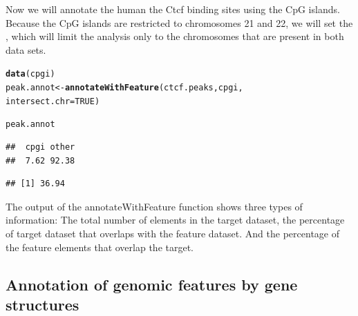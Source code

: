 \documentclass{article}\usepackage[]{graphicx}\usepackage[]{color}
\makeatletter
\newcommand{\hlnum}[1]{\textcolor[rgb]{0.686,0.059,0.569}{#1}}%
\newcommand{\hlstd}[1]{\textcolor[rgb]{0.345,0.345,0.345}{#1}}%
\newcommand{\hlkwb}[1]{\textcolor[rgb]{0.69,0.353,0.396}{#1}}%
\newcommand{\hlkwc}[1]{\textcolor[rgb]{0.333,0.667,0.333}{#1}}%
\newcommand{\hlkwd}[1]{\textcolor[rgb]{0.737,0.353,0.396}{\textbf{#1}}}%
\newenvironment{kframe}{%
 \def\at@end@of@kframe{}%
 \ifinner\ifhmode%
  \def\at@end@of@kframe{\end{minipage}}%
  \begin{minipage}{\columnwidth}%
 \fi\fi%
 \def\FrameCommand##1{\hskip\@totalleftmargin \hskip-\fboxsep
 \colorbox{shadecolor}{##1}\hskip-\fboxsep
     \hskip-\linewidth \hskip-\@totalleftmargin \hskip\columnwidth}%
 \MakeFramed {\advance\hsize-\width
   \@totalleftmargin\z@ \linewidth\hsize
   \@setminipage}}%
 {\par\unskip\endMakeFramed%
 \at@end@of@kframe}
\newenvironment{knitrout}{}{} %
\makeatother
\begin{document}
Now we will annotate the human the Ctcf binding sites using the CpG islands.
Because the CpG islands are restricted to chromosomes 21 and 22, we will set the
, which will limit the analysis only to the 
chromosomes that are present in both data sets.
\begin{knitrout}
\color{fgcolor}\begin{kframe}
\begin{alltt}
\hlkwd{data}\hlstd{(cpgi)}
\hlstd{peak.annot} \hlkwb{<-} \hlkwd{annotateWithFeature}\hlstd{(ctcf.peaks, cpgi,}
    \hlkwc{intersect.chr} \hlstd{=} \hlnum{TRUE}\hlstd{)}
\end{alltt}


{\ttfamily\noindent\itshape\color{messagecolor}{\#\# intersecting chromosomes...}}\begin{alltt}
\hlstd{peak.annot}
\end{alltt}


{\ttfamily\noindent\itshape\color{messagecolor}{\#\# summary of target set annotation with feature annotation:\\\#\# Rows in target set: 3964\\\#\# ----------------------------\\\#\# percentage of target elements overlapping with features:}}\begin{verbatim}
##  cpgi other 
##  7.62 92.38
\end{verbatim}


{\ttfamily\noindent\itshape\color{messagecolor}{\#\# \\\#\# percentage of feature elements overlapping with target:}}\begin{verbatim}
## [1] 36.94
\end{verbatim}


{\ttfamily\noindent\itshape\color{messagecolor}{\#\# }}\end{kframe}
\end{knitrout}


The output of the annotateWithFeature function shows three types of information:
The total number of elements in the target dataset, the percentage of target 
dataset that overlaps with the feature dataset. And the percentage of the feature
elements that overlap the target.

\subsection{Annotation of genomic features by gene structures}
\end{document}

